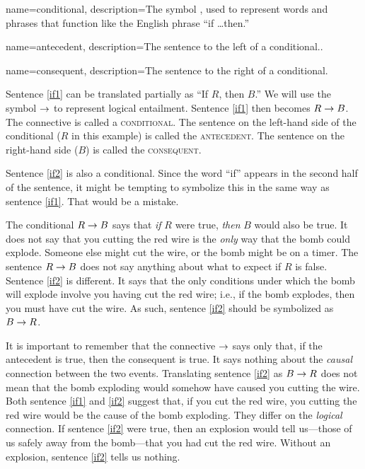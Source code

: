 {
name=conditional,
description={The symbol \eif, used to represent words and phrases that function like the English phrase ``if \ldots then.''}
}

{
name=antecedent,
description={The sentence to the left of a conditional..}
}


{
name=consequent,
description={The sentence to the right of a conditional.}
}


Sentence \ref{if1} can be translated partially as ``If $R$, then $B$.'' We will use the symbol $\rightarrow$ to represent logical {entailment}. Sentence \ref{if1} then becomes $R\rightarrow B$. The connective is called a \textsc{\gls{conditional}}. \label{def:conditional} The sentence on the left-hand side of the conditional ($R$ in this example) is called the \textsc{\gls{antecedent}}. \label{def:antecedent}
 The sentence on the right-hand side ($B$) is called the \textsc{\gls{consequent}}. \label{def:consequent} 

Sentence \ref{if2} is also a conditional. Since the word ``if'' appears in the second half of the sentence, it might be tempting to symbolize this in the same way as sentence \ref{if1}. That would be a mistake.

The conditional $R\rightarrow B$ says that \emph{if} $R$ were true, \emph{then} $B$ would also be true. It does not say that you cutting the red wire is the \emph{only} way that the bomb could explode. Someone else might cut the wire, or the bomb might be on a timer. The sentence $R\rightarrow B$ does not say anything about 
what to expect if $R$ is false. Sentence \ref{if2} is different. It says that the only conditions under which the bomb will explode involve you having cut the red wire; i.e., if the bomb explodes, then you must have cut the wire. As such, sentence \ref{if2} should be symbolized as $B \rightarrow R$.

It is important to remember that the connective $\rightarrow$ says only that, if the antecedent is true, then the consequent is true. It says nothing about the \emph{causal} connection between the two events. Translating sentence \ref{if2} as $B \rightarrow R$ does not mean that the bomb exploding would somehow have caused you cutting the wire. Both sentence \ref{if1} and \ref{if2} suggest that, if you cut the red wire, you cutting the red wire would be the cause of the bomb exploding. They differ on the \emph{logical} connection. If sentence \ref{if2} were true, then an explosion would tell us---those of us safely away from the bomb---that you had cut the red wire. Without an explosion, sentence \ref{if2} tells us nothing.

